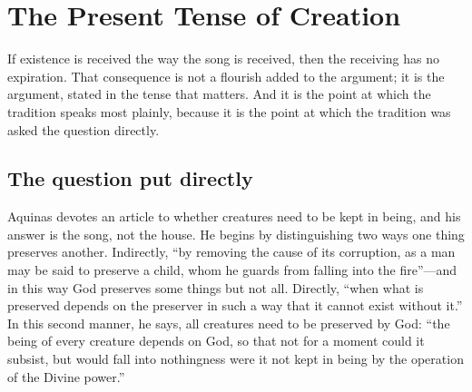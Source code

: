 \section{The Present Tense of Creation}

If existence is received the way the song is received, then the receiving has no expiration. That consequence is not a flourish added to the argument; it is the argument, stated in the tense that matters. And it is the point at which the tradition speaks most plainly, because it is the point at which the tradition was asked the question directly.

\subsection{The question put directly}

Aquinas devotes an article to whether creatures need to be kept in being, and his answer is the song, not the house. He begins by distinguishing two ways one thing preserves another. Indirectly, ``by removing the cause of its corruption, as a man may be said to preserve a child, whom he guards from falling into the fire''---and in this way God preserves some things but not all. Directly, ``when what is preserved depends on the preserver in such a way that it cannot exist without it.'' In this second manner, he says, all creatures need to be preserved by God: ``the being of every creature depends on God, so that not for a moment could it subsist, but would fall into nothingness were it not kept in being by the operation of the Divine power.''

